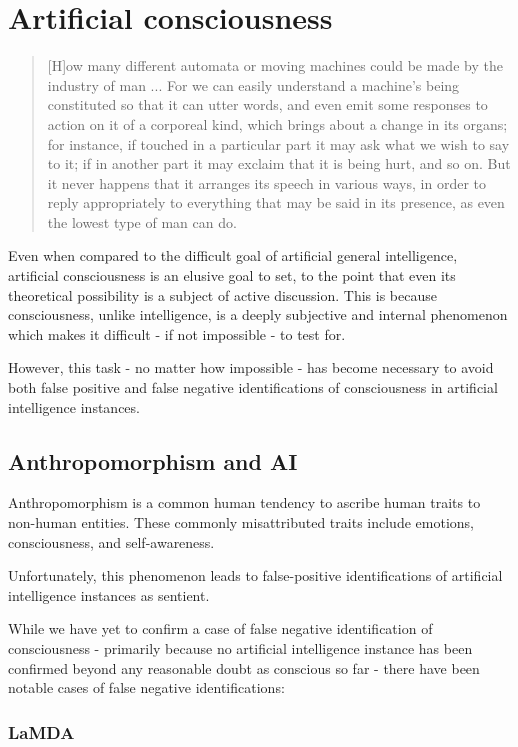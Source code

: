 \documentclass[masterthesis]{fer}
\begin{document}
\section{Artificial consciousness}
\begin{quote}
[H]ow many different automata or moving machines could be made by the industry of man ... For we can easily understand a machine's being constituted so that it can utter words, and even emit some responses to action on it of a corporeal kind, which brings about a change in its organs; for instance, if touched in a particular part it may ask what we wish to say to it; if in another part it may exclaim that it is being hurt, and so on. But it never happens that it arranges its speech in various ways, in order to reply appropriately to everything that may be said in its presence, as even the lowest type of man can do.
\cite{descartes1}
\end{quote}
Even when compared to the difficult goal of artificial general intelligence, artificial consciousness is an elusive goal to set, to the point that even its theoretical possibility is a subject of active discussion.
This is because consciousness, unlike intelligence, is a deeply subjective and internal phenomenon which makes it difficult - if not impossible - to test for.

However, this task - no matter how impossible - has become necessary to avoid both false positive and false negative identifications of consciousness in artificial intelligence instances.

\subsection{Anthropomorphism and AI}

Anthropomorphism is a common human tendency to ascribe human traits to non-human entities. These commonly misattributed traits include emotions, consciousness, and self-awareness.

Unfortunately, this phenomenon leads to false-positive identifications of artificial intelligence instances as sentient.

While we have yet to confirm a case of false negative identification of consciousness - primarily because no artificial intelligence instance has been confirmed beyond any reasonable doubt as conscious so far - there have been notable cases of false negative identifications:

\subsubsection{LaMDA}
\end{document}
